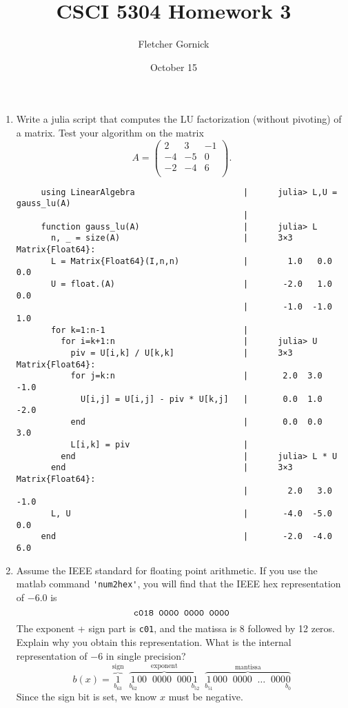 \documentclass[11pt]{article}
\title{\vspace{-1.0cm}CSCI 5304 Homework 3}
\author{Fletcher Gornick}
\date{October 15}
\newcommand{\n}{\vspace{0.3cm}}
\begin{document}
\maketitle
\begin{enumerate}
	\item Write a julia script that computes the LU factorization (without pivoting) of a matrix.  Test your algorithm on the matrix
	      \[A = \left(\begin{array}{rrr} 2 & 3 & -1 \\ -4 & -5 & 0 \\ -2 & -4 & 6 \\ \end{array}\right).\]
	      \begin{verbatim}
     using LinearAlgebra                      |      julia> L,U = gauss_lu(A)
                                              |      
     function gauss_lu(A)                     |      julia> L
       n, _ = size(A)                         |      3×3 Matrix{Float64}:
       L = Matrix{Float64}(I,n,n)             |        1.0   0.0  0.0
       U = float.(A)                          |       -2.0   1.0  0.0
                                              |       -1.0  -1.0  1.0
       for k=1:n-1                            |      
         for i=k+1:n                          |      julia> U
           piv = U[i,k] / U[k,k]              |      3×3 Matrix{Float64}:
           for j=k:n                          |       2.0  3.0  -1.0
             U[i,j] = U[i,j] - piv * U[k,j]   |       0.0  1.0  -2.0
           end                                |       0.0  0.0   3.0
           L[i,k] = piv                       |      
         end                                  |      julia> L * U
       end                                    |      3×3 Matrix{Float64}:
                                              |        2.0   3.0  -1.0
       L, U                                   |       -4.0  -5.0   0.0
     end                                      |       -2.0  -4.0   6.0
        \end{verbatim}

	\item Assume the IEEE standard for floating point arithmetic.  If you use the matlab command \verb!'num2hex'!, you will find that the IEEE hex representation of \(-6.0\) is
	      \[\verb!c018 0000 0000 0000!\]
	      The exponent + sign part is \verb!c01!, and the matissa is \(8\) followed by 12 zeros.  Explain why you obtain this representation.  What is the internal representation of \(-6\) in single precision?
	      \[b(x) = \overbrace{\underset{b_{63}}1}^{\text{sign}} \;\; \overbrace{\underset{b_{62}}1 00 \;\; 0000 \;\; 000 \underset{b_{52}}1}^{\text{exponent}} \;\; \overbrace{\underset{b_{51}}1 000 \;\; 0000 \;\;\hdots \;\; 000 \underset{b_0}0}^{\text{mantissa}}\]
	      Since the sign bit is set, we know \(x\) must be negative. \n


\end{enumerate}
\end{document}
